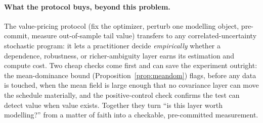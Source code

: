 \documentclass[12pt]{article}
\begin{document}
\paragraph{What the protocol buys, beyond this problem.} The value-pricing protocol
(fix the optimizer, perturb one modelling object, pre-commit, measure out-of-sample
tail value) transfers to any correlated-uncertainty stochastic program: it lets a
practitioner decide \emph{empirically} whether a dependence, robustness, or
richer-ambiguity layer earns its estimation and compute cost. Two cheap checks come
first and can save the experiment outright: the mean-dominance bound
(Proposition~\ref{prop:meandom}) flags, before any data is touched, when the mean field
is large enough that no covariance layer can move the schedule materially, and the
positive-control check confirms the test can detect value when value exists. Together
they turn ``is this layer worth modelling?'' from a matter of faith into a checkable,
pre-committed measurement.
\end{document}
